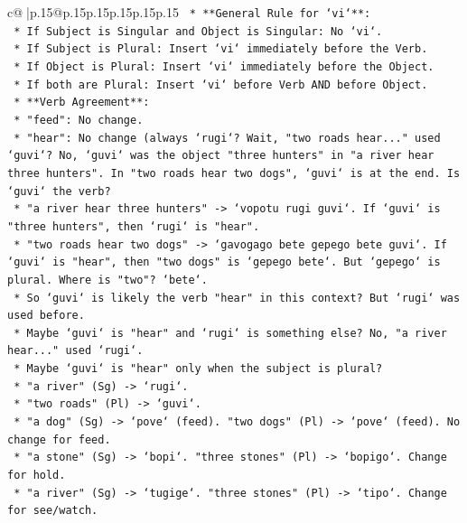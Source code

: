 \documentclass{article}
\begin{document}
{\begin{supertabular}{c@{$\;$}|p{.15\linewidth}@{}p{.15\linewidth}p{.15\linewidth}p{.15\linewidth}p{.15\linewidth}p{.15\linewidth}}
{{{\texttt{        *   **General Rule for `vi`**:} \\
\texttt{            *   If Subject is Singular and Object is Singular: No `vi`.} \\
\texttt{            *   If Subject is Plural: Insert `vi` immediately before the Verb.} \\
\texttt{            *   If Object is Plural: Insert `vi` immediately before the Object.} \\
\texttt{            *   If both are Plural: Insert `vi` before Verb AND before Object.} \\
\texttt{        *   **Verb Agreement**:} \\
\texttt{            *   "feed": No change.} \\
\texttt{            *   "hear": No change (always `rugi`? Wait, "two roads hear..." used `guvi`? No, `guvi` was the object "three hunters" in "a river hear three hunters". In "two roads hear two dogs", `guvi` is at the end. Is `guvi` the verb?} \\
\texttt{                *   "a river hear three hunters" {-}> `vopotu rugi guvi`. If `guvi` is "three hunters", then `rugi` is "hear".} \\
\texttt{                *   "two roads hear two dogs" {-}> `gavogago bete gepego bete guvi`. If `guvi` is "hear", then "two dogs" is `gepego bete`. But `gepego` is plural. Where is "two"? `bete`.} \\
\texttt{                *   So `guvi` is likely the verb "hear" in this context? But `rugi` was used before.} \\
\texttt{                *   Maybe `guvi` is "hear" and `rugi` is something else? No, "a river hear..." used `rugi`.} \\
\texttt{                *   Maybe `guvi` is "hear" only when the subject is plural?} \\
\texttt{                *   "a river" (Sg) {-}> `rugi`.} \\
\texttt{                *   "two roads" (Pl) {-}> `guvi`.} \\
\texttt{                *   "a dog" (Sg) {-}> `pove` (feed). "two dogs" (Pl) {-}> `pove` (feed). No change for feed.} \\
\texttt{                *   "a stone" (Sg) {-}> `bopi`. "three stones" (Pl) {-}> `bopigo`. Change for hold.} \\
\texttt{                *   "a river" (Sg) {-}> `tugige`. "three stones" (Pl) {-}> `tipo`. Change for see/watch.} \\
}}}
\end{supertabular}}
\end{document}
